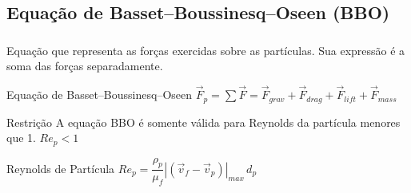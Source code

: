 \documentclass{beamer}
\begin{document}
\subsection{Equação de Basset–Boussinesq–Oseen (BBO)}
\begin{frame}
  \frametitle{\subsecname}
  
    Equação que representa as forças exercidas sobre as partículas.
    Sua expressão é a soma das forças separadamente.
  
  \begin{block}{Equação de Basset–Boussinesq–Oseen}
    \centering
    $\vec{F}_{p} = \sum\vec{F} = \vec{F}_{grav} + \vec{F}_{drag} + \vec{F}_{lift} + \vec{F}_{mass}$
  \end{block}
  
  \begin{minipage}{.50\textwidth}
    \begin{block}{Restrição}
      A equação BBO é somente válida para Reynolds da partícula menores que 1.
      $Re_{p} < 1$
    \end{block}
  \end{minipage}
  \hfill
  \begin{minipage}{.46\textwidth}
    \begin{block}{Reynolds de Partícula}
      \centering
      $Re_{p} = \dfrac{\rho_p}{\mu_f} |\left(\vec{v}_{f} - \vec{v}_{p} \right)|_{max}\, d_{p}$
    \end{block}
  \end{minipage}
\end{frame}
\end{document}
